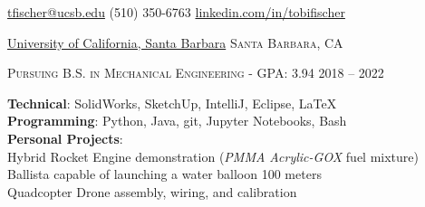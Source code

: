 \documentclass[12pt]{article}
\begin{document}
	\sloppy  %
	
	
	
	\nobreakvspace{0.3em}  %
	
	
	
	\noindent\href{mailto:tfischer@ucsb.edu}{tfischer@ucsb.edu}\sbull
	(510) 350-6763 \sbull
	\href{https://linkedin.com/in/tobifischer}{linkedin.com/in/tobifischer}\hfill
	
	
	\spacedhrule{0.2em}{-0.7em}  %
	
	
	\headedsection
	{\href{https://engineering.ucsb.edu/}{University of California, Santa Barbara}}
	{\textsc{Santa Barbara, CA}} {%
		\headedsubsection
		{\textsc{Pursuing B.S. in Mechanical Engineering - GPA:} 3.94}
		{2018 -- 2022}{}
		\vspace{-.1em}
		
	\vspace{-.25em}
		
		\vspace{-.25em}
		
	}
	
	\spacedhrule{-0.2em}{-0.8em}
	
	
	\textbf{Technical}: SolidWorks, SketchUp, IntelliJ, Eclipse, \LaTeX\\
	\textbf{Programming}: Python, Java, git, Jupyter Notebooks, Bash\\
	\textbf{Personal Projects}:\\
	\sbull Hybrid Rocket Engine demonstration (\textit{PMMA Acrylic-GOX} fuel mixture)\\
	\sbull Ballista capable of launching a water balloon 100 meters\\
	\sbull Quadcopter Drone assembly, wiring, and calibration\\
	
\end{document}
